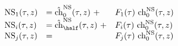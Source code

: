 \begin{equation} \label{NS-orbits}
  \begin{array}{lll}
   {\rm NS}_1(\tau,z) &= \hat{\rm ch}^{\rm NS}_0(\tau,z) ~+& F_1(\tau) ~{\rm ch}^{\rm NS}_0(\tau,z)\\
   {\rm NS}_i(\tau,z) &= \hat{\rm ch}^{\rm NS}_\half(\tau,z) ~+& F_i(\tau) ~{\rm ch}^{\rm NS}_0(\tau,z)\\
   {\rm NS}_j(\tau,z) &=  &F_j(\tau) ~{\rm ch}^{\rm NS}_0(\tau,z)
  \end{array}
\end{equation}

